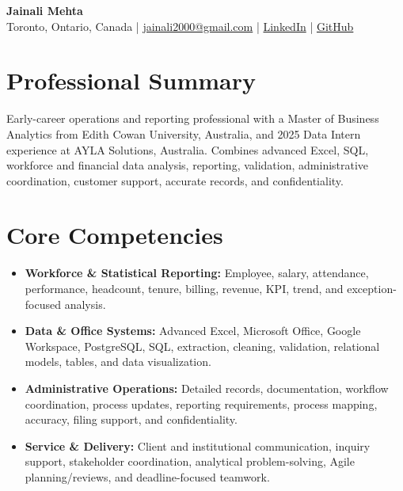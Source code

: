 \documentclass[letterpaper,10pt]{article}
\begin{document}
\begin{center}
  {\fontsize{17}{19}\selectfont\textbf{Jainali Mehta}}\\[2pt]
  \small Toronto, Ontario, Canada \;|\;
  \href{mailto:jainali2000@gmail.com}{jainali2000@gmail.com} \;|\;
  \href{https://www.linkedin.com/in/jainali-mehta}{LinkedIn} \;|\;
  \href{https://github.com/jainalimehta}{GitHub}
\end{center}
\vspace{-7pt}

\section{Professional Summary}
\small Early-career operations and reporting professional with a Master of Business Analytics from Edith Cowan University, Australia, and 2025 Data Intern experience at AYLA Solutions, Australia. Combines advanced Excel, SQL, workforce and financial data analysis, reporting, validation, administrative coordination, customer support, accurate records, and confidentiality.

\section{Core Competencies}
\begin{itemize}[leftmargin=0.16in,label=\textbullet,topsep=0pt,itemsep=1pt,parsep=0pt]
  \item \small \textbf{Workforce \& Statistical Reporting:} Employee, salary, attendance, performance, headcount, tenure, billing, revenue, KPI, trend, and exception-focused analysis.
  \item \small \textbf{Data \& Office Systems:} Advanced Excel, Microsoft Office, Google Workspace, PostgreSQL, SQL, extraction, cleaning, validation, relational models, tables, and data visualization.
  \item \small \textbf{Administrative Operations:} Detailed records, documentation, workflow coordination, process updates, reporting requirements, process mapping, accuracy, filing support, and confidentiality.
  \item \small \textbf{Service \& Delivery:} Client and institutional communication, inquiry support, stakeholder coordination, analytical problem-solving, Agile planning/reviews, and deadline-focused teamwork.
\end{itemize}
\end{document}
